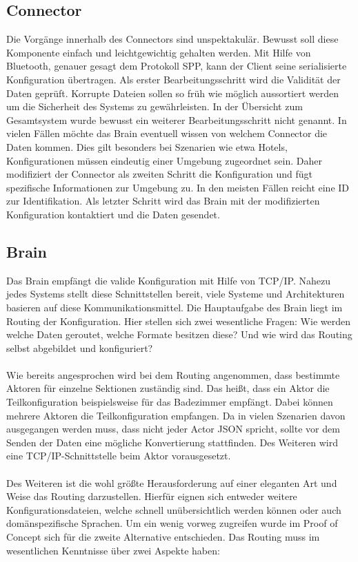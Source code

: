 \subsection{Connector}
Die Vorgänge innerhalb des Connectors sind unspektakulär. Bewusst soll diese Komponente einfach und leichtgewichtig gehalten werden. Mit Hilfe von Bluetooth, genauer gesagt dem Protokoll SPP, kann der Client seine serialisierte Konfiguration übertragen. Als erster Bearbeitungsschritt wird die Validität der Daten geprüft. Korrupte Dateien sollen so früh wie möglich aussortiert werden um die Sicherheit des Systems zu gewährleisten. In der Übersicht zum Gesamtsystem wurde bewusst ein weiterer Bearbeitungsschritt nicht genannt. In vielen Fällen möchte das Brain eventuell wissen von welchem Connector die Daten kommen. Dies gilt besonders bei Szenarien wie etwa Hotels, Konfigurationen müssen eindeutig einer Umgebung zugeordnet sein. Daher modifiziert der Connector als zweiten Schritt die Konfiguration und fügt spezifische Informationen zur Umgebung zu. In den meisten Fällen reicht eine ID zur Identifikation. Als letzter Schritt wird das Brain mit der modifizierten Konfiguration kontaktiert und die Daten gesendet. 

\subsection{Brain}

Das Brain empfängt die valide Konfiguration mit Hilfe von TCP/IP. Nahezu jedes Systems stellt diese Schnittstellen bereit, viele Systeme und Architekturen basieren auf diese Kommunikationsmittel.
Die Hauptaufgabe des Brain liegt im Routing der Konfiguration. Hier stellen sich zwei wesentliche Fragen: Wie werden welche Daten geroutet, welche Formate besitzen diese? Und wie wird das Routing selbst abgebildet und konfiguriert? 
\\\\
Wie bereits angesprochen wird bei dem Routing angenommen, dass bestimmte Aktoren für einzelne Sektionen zuständig sind. Das heißt, dass ein Aktor die Teilkonfiguration beispielsweise für das Badezimmer empfängt. Dabei können mehrere Aktoren die Teilkonfiguration empfangen. Da in vielen Szenarien davon ausgegangen werden muss, dass nicht jeder Actor JSON spricht, sollte vor dem Senden der Daten eine mögliche Konvertierung stattfinden. Des Weiteren wird eine TCP/IP-Schnittstelle beim Aktor vorausgesetzt. 
\\\\
Des Weiteren ist die wohl größte Herausforderung auf einer eleganten Art und Weise das Routing darzustellen. Hierfür eignen sich entweder weitere Konfigurationsdateien, welche schnell unübersichtlich werden können oder auch domänspezifische Sprachen. Um ein wenig vorweg zugreifen wurde im Proof of Concept sich für die zweite Alternative entschieden. Das Routing muss im wesentlichen Kenntnisse über zwei Aspekte haben: 

